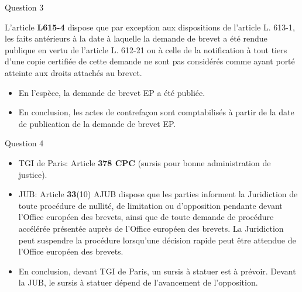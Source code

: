 \begin{frame}{Question 3}

\begin{block}{}
L'article \textbf{L615-4} dispose que
par exception aux dispositions de l'article L. 613-1,
 les faits antérieurs à la date à laquelle
  la demande de brevet a été rendue publique 
  en vertu de l'article L. 612-21 ou
   à celle de la notification à tout tiers 
   d'une copie certifiée de cette demande 
   ne sont pas considérés comme 
ayant porté atteinte aux droits attachés au brevet. 
\end{block}

\begin{itemize}
  \item En l'espèce, la demande de brevet EP
  a été publiée.
  \item En conclusion, les actes de contrefaçon sont
  comptabilisés à partir de la date de publication
  de la demande de brevet EP.
\end{itemize}

\end{frame}

\begin{frame}{Question 4}

\begin{block}{}
\begin{itemize}
    \item TGI de Paris: Article \textbf{378 CPC} (sursis pour bonne administration de justice).
    \item JUB: Article \textbf{33}(10) AJUB dispose que
les parties informent la Juridiction
de toute procédure de nullité, de limitation 
ou d'opposition pendante devant
l'Office européen des brevets, ainsi que
de toute demande de procédure accélérée
 présentée auprès de l'Office européen des brevets.
  La Juridiction peut
suspendre la procédure lorsqu'une
décision rapide peut être attendue de
l'Office européen des brevets.
\end{itemize}
\end{block}

\begin{itemize}
    \item En conclusion, devant TGI de Paris,
    un sursis à statuer est à prévoir.
    Devant la JUB, le sursis à statuer
    dépend de l'avancement de l'opposition.
\end{itemize}

\end{frame}

